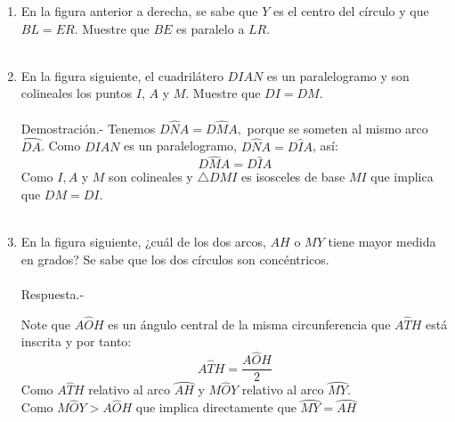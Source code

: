 \documentclass[10pt]{article}
\begin{document}
\begin{enumerate}
\item En la figura anterior a derecha, se sabe que $Y$ es el centro del círculo y que $BL = ER$. Muestre que $BE$ es paralelo a $LR$.\\\\

\item En la figura siguiente, el cuadrilátero $DIAN$ es un paralelogramo y son colineales los puntos $I$, $A$ y $M$. Muestre que $DI = DM$.\\\\
    Demostración.-\; Tenemos $D\widehat{N}A=D\widehat{M}A,$ porque se someten al mismo arco  $\wideparen{DA}$. Como $DIAN$ es un paralelogramo, $D\widehat{N}A = D\widehat{I}A$, así: $$D\widehat{M}A=D\widehat{I}A$$ 
    Como $I,A$ y $M$ son colineales y $\triangle DMI$ es isosceles de base $MI$ que implica que $DM=DI$.\\\\

\item En la figura siguiente, ¿cuál de los dos arcos,  $AH$ o $MY$ tiene mayor medida en grados? Se sabe que los dos círculos son concéntricos.\\\\
    Respuesta.-\; 
    \begin{center}
    \end{center}
    Note que $A\widehat{O}H$ es un ángulo central de la misma circunferencia que $A\widehat{T}H$ está inscrita y por tanto:
    $$A\widehat{T}H=\dfrac{A\widehat{O}H}{2}$$ 
    Como $A\widehat{T}H$ relativo al arco $\wideparen{AH}$ y $M\widehat{O}Y$ relativo al arco $\wideparen{MY}$.\\
    Como $M\widehat{O}Y>A\widehat{O}H$ que implica directamente que $\wideparen{MY}=\wideparen{AH}$\\\\








\end{enumerate}
\end{document}
